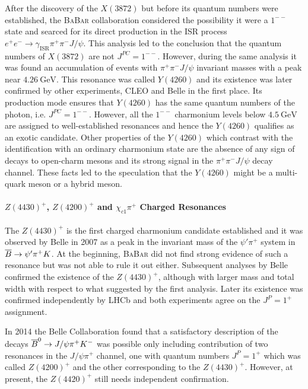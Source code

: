 After the discovery of the $X(3872)$ but before its quantum numbers were established, the \textsc{BaBar} collaboration considered the possibility it were a $1^{- -}$ state and searced for its direct production in the ISR process $e^+ e^- \to \gamma_\text{ISR} \pi^+ \pi^- J/\psi$. This analysis led to the conclusion that the quantum numbers of $X(3872)$ are not $J^{P C} = 1^{- -}$. However, during the same analysis it was found an accumulation of events with $\pi^+ \pi^- J/\psi$ invariant masses with a peak near $4.26 \ \text{GeV}$. This resonance was called $Y(4260)$ and its existence was later confirmed by other experiments, CLEO and Belle in the first place. Its production mode ensures that $Y(4260)$ has the same quantum numbers of the photon, i.e. $J^{P C} = 1^{- -}$. However, all the $1^{- -}$ charmonium levels below $4.5 \ \text{GeV}$ are assigned to well-established resonances and hence the $Y(4260)$ qualifies as an exotic candidate. Other properties of the $Y(4260)$ which contrast with the identification with an ordinary charmonium state are the absence of any sign of decays to open-charm mesons and its strong signal in the $\pi^+ \pi^- J/\psi$ decay channel. These facts led to the speculation that the $Y(4260)$ might be a multi-quark meson or a hybrid meson. 
 
\paragraph{$Z(4430)^+$, $Z(4200)^+$ and $\chi_{c1} \pi^+$ Charged Resonances} The $Z(4430)^+$ is the first charged charmonium candidate established and it was observed by Belle in 2007 as a peak in the invariant mass of the $\psi' \pi^+$ system in $\overline{B} \to \psi' \pi^+ K$. At the beginning, \textsc{BaBar} did not find strong evidence of such a resonance but was not able to rule it out either. Subsequent analyses by Belle confirmed the existence of the $Z(4430)^+$, although with larger mass and total width with respect to what suggested by the first analysis. Later its existence was confirmed independently by LHCb and both experiments agree on the $J^P = 1^+$ assignment.

In 2014 the Belle Collaboration found that a satisfactory description of the decays $\overline{B}^0 \to J/\psi \pi^+ K^-$ was possible only including contribution of two resonances in the $J/\psi \pi^+$ channel, one with quantum numbers $J^P = 1^+$ which was called $Z(4200)^+$ and the other corresponding to the $Z(4430)^+$. However, at present, the $Z(4420)^+$ still needs independent confirmation.

